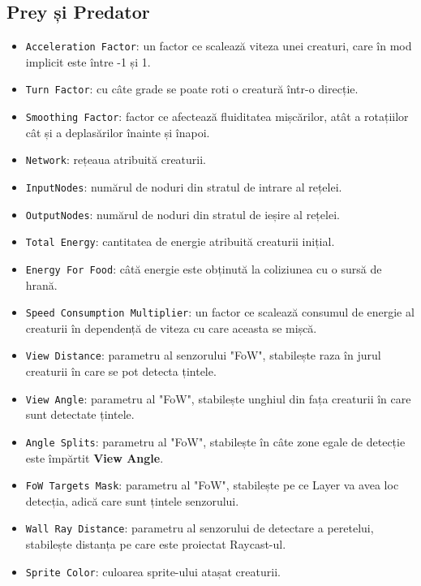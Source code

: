 \subsection{Prey și Predator}
\begin{itemize}
\item \texttt{Acceleration Factor}: un factor ce scalează viteza unei creaturi, care în mod implicit este între -1 și 1.
\item \texttt{Turn Factor}: cu câte grade se poate roti o creatură într-o direcție.
\item \texttt{Smoothing Factor}: factor ce afectează fluiditatea mișcărilor, atât a rotațiilor cât și a deplasărilor înainte și înapoi.
\item \texttt{Network}: rețeaua atribuită creaturii.
\item \texttt{InputNodes}: numărul de noduri din stratul de intrare al rețelei.
\item \texttt{OutputNodes}: numărul de noduri din stratul de ieșire al rețelei.
\item \texttt{Total Energy}: cantitatea de energie atribuită creaturii inițial.
\item \texttt{Energy For Food}: câtă energie este obținută la coliziunea cu o sursă de hrană.
\item \texttt{Speed Consumption Multiplier}: un factor ce scalează consumul de energie al creaturii în dependență de viteza cu care aceasta se mișcă.
\item \texttt{View Distance}: parametru al senzorului "FoW", stabilește raza în jurul creaturii în care se pot detecta țintele.
\item \texttt{View Angle}: parametru al "FoW", stabilește unghiul din fața creaturii în care sunt detectate țintele.
\item \texttt{Angle Splits}: parametru al "FoW", stabilește în câte zone egale de detecție este împărtit \textbf{View Angle}.
\item \texttt{FoW Targets Mask}: parametru al "FoW", stabilește pe ce Layer va avea loc detecția, adică care sunt țintele senzorului.
\item \texttt{Wall Ray Distance}: parametru al senzorului de detectare a peretelui, stabilește distanța pe care este proiectat Raycast-ul.
\item \texttt{Sprite Color}: culoarea sprite-ului atașat creaturii.
\end{itemize}

